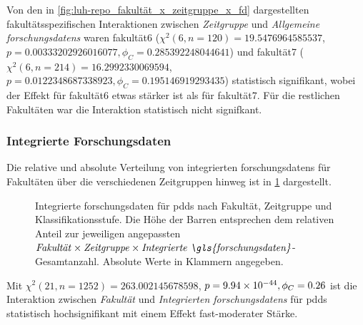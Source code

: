 Von den in \cref{fig:luh-repo_fakultät_x_zeitgruppe_x_fd} dargestellten fakultätsspezifischen Interaktionen zwischen \textit{Zeitgruppe} und \textit{Allgemeine \glspl{forschungsdaten}} waren \gls{fakultät6} ($\chi^2 (\num{6}, n=\num{120}) = \num[round-mode=places,round-precision=2]{19.5476964585537}$, $p = \num[round-mode=places,round-precision=2]{0.00333202926016077},\phi_C=\num[round-mode=places,round-precision=2]{0.285392248044641}$) und \gls{fakultät7} ($\chi^2 (\num{6}, n=\num{214}) = \num[round-mode=places,round-precision=2]{16.2992330069594}$, $p = \num[round-mode=places,round-precision=2]{0.0122348687338923},\phi_C=\num[round-mode=places,round-precision=2]{0.195146919293435}$) statistisch signifikant, wobei der Effekt für \gls{fakultät6} etwas stärker ist als für \gls{fakultät7}.
Für die restlichen Fakultäten war die Interaktion statistisch nicht signifkant.

\subsubsection{Integrierte Forschungsdaten}
Die relative und absolute Verteilung von integrierten \glspl{forschungsdaten} für Fakultäten über die verschiedenen Zeitgruppen hinweg ist in \cref{fig:luh-repo_fakultät_x_zeitgruppe_x_intern-fd} dargestellt.
\begin{figure}[!htbp]
    \resizebox{\ifdim\width>\textwidth\textwidth\else\width\fi}{!}{}
    \caption{Integrierte \gls{forschungsdaten} für \glspl{pdd} nach Fakultät, Zeitgruppe und Klassifikationsstufe.
    Die Höhe der Barren entsprechen dem relativen Anteil zur jeweiligen angepassten $\text{\textit{Fakultät}}\times\text{\textit{Zeitgruppe}}\times\text{\textit{Integrierte \gls{forschungsdaten}}}$-Gesamtanzahl.
    Absolute Werte in Klammern angegeben.}
    \label{fig:luh-repo_fakultät_x_zeitgruppe_x_intern-fd}
\end{figure}
Mit $\chi^2 (\num{21}, n=\num{1252}) = \num[round-mode=places,round-precision=2]{263.002145678598}$, $p = \num[round-mode=places,round-precision=2]{9.94476930299567E-44},\phi_C=\num[round-mode=places,round-precision=2]{0.264616459279196}$ ist die Interaktion zwischen \textit{Fakultät} und \textit{Integrierten \glspl{forschungsdaten}} für \glspl{pdd} statistisch hochsignifikant mit einem Effekt fast-moderater Stärke.

